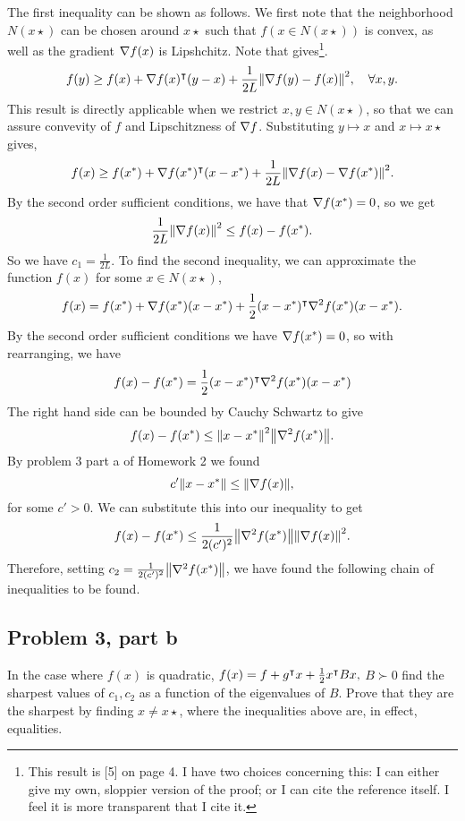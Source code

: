 \begin{solution}

    The first inequality can be shown as follows. We first note that the neighborhood $N(x\star)$ can be chosen around $x\star$ such that $f(x \in N(x\star))$ is convex, as well as the gradient $\nabla f(x)$ is Lipshchitz. Note that \cite{zhou2018fenchel} gives\footnote{This result is [5] on page 4. I have two choices concerning this: I can either give my own, sloppier version of the proof; or I can cite the reference itself. I feel it is more transparent that I cite it.}. 
    \[f(y) \geq f(x) + \nabla f(x)^\intercal (y - x) + \frac{1}{2L}\norm{\nabla f(y) - f(x)}^2, \quad \forall x, y.\]
    This result is directly applicable when we restrict $x, y \in N(x\star)$, so that we can assure convevity of $f$ and Lipschitzness of $\nabla f$. Substituting $y \mapsto x$ and $x \mapsto x\star$ gives,
    \[f(x) \geq f(x^{*}) + \nabla f(x^{*})^\intercal (x - x^{*}) + \frac{1}{2L}\norm{\nabla f(x) - \nabla f(x^{*})}^2.\]
    By the second order sufficient conditions, we have that $\nabla f(x^{*}) = 0$, so we get 
    \[\frac{1}{2L}\norm{\nabla f(x)}^2 \leq f(x) - f(x^{*}).\]
    So we have $c_1 = \frac{1}{2L}$. To find the second inequality, we can approximate the function $f(x)$ for some $x \in N(x\star)$, 
    \[f(x) = f(x^{*}) + \nabla f(x^{*})(x - x^{*}) + \frac{1}{2}(x - x^{*})^\intercal \nabla^2 f(x^{*})(x - x^{*}).\]
    By the second order sufficient conditions we have $\nabla f(x^{*}) = 0$, so with rearranging, we have
    \[f(x) - f(x^{*}) = \frac{1}{2}(x - x^{*})^\intercal \nabla^2 f(x^{*})(x - x^{*})\]
    The right hand side can be bounded by Cauchy Schwartz to give
    \[f(x) - f(x^{*}) \leq \norm{x - x^{*}}^2 \norm{\nabla^2f(x^{*})}.\]
    By problem 3 part a of Homework 2 we found 
    \[c'\norm{x - x^{*}} \leq \norm{\nabla f(x)},\]
    for some $c' > 0.$ We can substitute this into our inequality to get
    \[f(x) - f(x^{*}) \leq \frac{1}{2(c')^2} \norm{\nabla^2f(x^{*})}\norm{\nabla f(x)}^2.\]
    Therefore, setting $c_2 = \frac{1}{2(c')^2}\norm{\nabla^2 f(x^{*})}$, we have found the following chain of inequalities to be found.  
\end{solution}

\newpage
\subsection{Problem 3, part b}
In the case where $f(x)$ is quadratic,
$f(x) = f + g^\intercal x + \frac{1}{2}x^\intercal Bx,$ $ B\succ 0$ find the sharpest values of $c_1, c_2$ as a function of the eigenvalues of $B$. Prove that they are the sharpest by finding $x \neq x\star$, where the inequalities above are, in effect, equalities.
